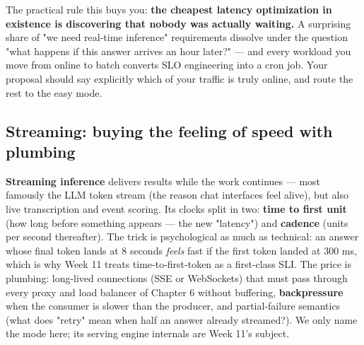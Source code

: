 The practical rule this buys you: \textbf{the cheapest latency optimization in existence is discovering that nobody was actually waiting.} A surprising share of "we need real-time inference" requirements dissolve under the question "what happens if this answer arrives an hour later?" — and every workload you move from online to batch converts SLO engineering into a cron job. Your proposal should say explicitly which of your traffic is truly online, and route the rest to the easy mode.

\subsection*{Streaming: buying the feeling of speed with plumbing}

\textbf{Streaming inference} delivers results while the work continues — most famously the LLM token stream (the reason chat interfaces feel alive), but also live transcription and event scoring. Its clocks split in two: \textbf{time to first unit} (how long before something appears — the new "latency") and \textbf{cadence} (units per second thereafter). The trick is psychological as much as technical: an answer whose final token lands at 8 seconds \textit{feels} fast if the first token landed at 300 ms, which is why Week 11 treats time-to-first-token as a first-class SLI. The price is plumbing: long-lived connections (SSE or WebSockets) that must pass through every proxy and load balancer of Chapter 6 without buffering, \textbf{backpressure} when the consumer is slower than the producer, and partial-failure semantics (what does "retry" mean when half an answer already streamed?). We only name the mode here; its serving engine internals are Week 11's subject.

